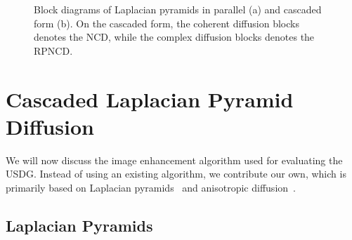 \begin{figure}
\begin{minipage}[c]{0.53\textwidth}
    \label{fig:clpd}
  \end{minipage}
  \caption{Block diagrams of Laplacian pyramids in parallel (a) and cascaded form (b).
    On the cascaded form, the coherent diffusion blocks denotes the NCD, while the complex diffusion blocks denotes the RPNCD.
  }\label{fig:filters}
  \vspace{-0.15in}
\end{figure}
%
\section{Cascaded Laplacian Pyramid Diffusion}\label{section:filter}
%
We will now discuss the image enhancement algorithm used for evaluating the USDG.
Instead of using an existing algorithm, we contribute our own, which is primarily based on Laplacian pyramids~\cite{zhang_multiscale_2006, zhang_nonlinear_2007, kang_new_2016} and anisotropic diffusion~\cite{perona_scalespace_1990, weickert_anisotropic_1998}.

\subsection{Laplacian Pyramids}


